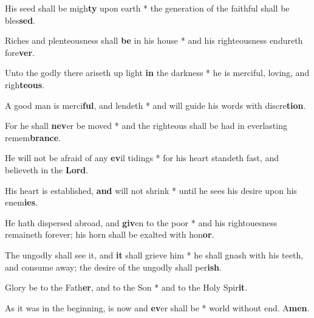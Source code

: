 \begin{multicols}{2}
	His seed shall be migh\textbf{ty} upon earth * the generation of the faithful shall be bles\textbf{sed}.
	
	Riches and plenteousness shall \textbf{be} in his house * and his righteousness endureth fore\textbf{ver}.
	
	Unto the godly there ariseth up light \textbf{in} the darkness * he is merciful, loving, and righ\textbf{teous}.
	
	A good man is merci\textbf{ful}, and lendeth * and will guide his words with discre\textbf{tion}.
	
	For he shall \textbf{nev}er be moved * and the righteous shall be had in everlasting remem\textbf{brance}.
	
	He will not be afraid of any \textbf{ev}il tidings * for his heart standeth fast, and believeth in the \textbf{Lord}.
	
	His heart is established, \textbf{and} will not shrink * until he sees his desire upon his enem\textbf{ies}.
	
	He hath dispersed abroad, and \textbf{giv}en to the poor * and his rightouesness remaineth forever; his horn shall be exalted with hon\textbf{or}.
	
	The ungodly shall see it, and \textbf{it} shall grieve him * he shall gnash with his teeth, and consume away; the desire of the ungodly shall per\textbf{ish}.
	
	Glory be to the Fath\textbf{er}, and to the Son * and to the Holy Spir\textbf{it}.
	
	As it was in the beginning, is now and \textbf{ev}er shall be * world without end. A\textbf{men}.
\end{multicols}